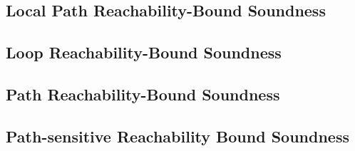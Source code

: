 \subsection{Local Path Reachability-Bound Soundness}
\label{apdx:pathlocalrb-sound}

\clearpage

\subsection{Loop Reachability-Bound Soundness}
\label{apdx:looprb-sound}

\clearpage


\subsection{Path Reachability-Bound Soundness}
\label{apdx:pathrb-sound}

\clearpage

\subsection{Path-sensitive Reachability Bound Soundness}
\label{apdx:psrb-sound}

\clearpage

